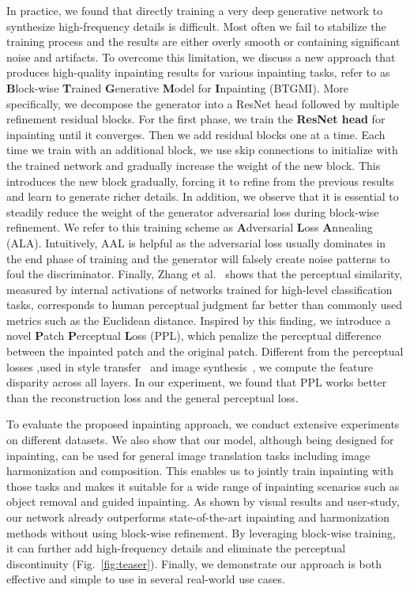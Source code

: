 In practice, we found that directly training a very deep generative network to synthesize high-frequency details is difficult. Most often we fail to stabilize the training process and the results are either overly smooth or containing significant noise and artifacts. To overcome this limitation, we discuss a new approach that produces high-quality inpainting results for various inpainting tasks, refer to as \textbf{B}lock-wise \textbf{T}rained \textbf{G}enerative \textbf{M}odel for \textbf{I}npainting (BTGMI). More specifically, we decompose the generator into a ResNet head followed by multiple refinement residual blocks. For the first phase, we train the \textbf{ResNet head} for inpainting until it converges. Then we add residual blocks one at a time. Each time we train with an additional block, we use skip connections to initialize with the trained network and gradually increase the weight of the new block. This introduces the new block gradually, forcing it to refine from the previous results and learn to generate richer details. In addition, we observe that it is essential to steadily reduce the weight of the generator adversarial loss during block-wise refinement. We refer to this training scheme as \textbf{A}dversarial \textbf{L}oss \textbf{A}nnealing (ALA).  Intuitively, AAL is helpful as the adversarial loss usually dominates in the end phase of training and the generator will falsely create noise patterns to foul the discriminator. Finally, Zhang et al.~\cite{zhang2018unreasonable} shows that the perceptual similarity, measured by internal activations of networks trained for high-level classification tasks, corresponds to human perceptual judgment far better than commonly used metrics such as the Euclidean distance. Inspired by this finding, we introduce a novel \textbf{P}atch \textbf{P}erceptual \textbf{L}oss (PPL), which penalize the perceptual difference between the inpainted patch and the original patch. Different from the perceptual losses ,used in style transfer~\cite{johnson2016perceptual,gatys2016image} and image synthesis~\cite{dosovitskiy2016generating,chen2017photographic}, we compute the feature disparity across all layers. In our experiment, we found that PPL works better than the reconstruction loss and the general perceptual loss. 

To evaluate the proposed inpainting approach, we conduct extensive experiments on different datasets. We also show that our model, although being designed for inpainting, can be used for general image translation tasks including image harmonization and composition. This enables us to jointly train inpainting with those tasks and makes it suitable for a wide range of inpainting scenarios such as object removal and guided inpainting. As shown by visual results and user-study, our network already outperforms state-of-the-art inpainting and harmonization methods without using block-wise refinement. By leveraging block-wise training, it can further add high-frequency details and eliminate the perceptual discontinuity (Fig.~\ref{fig:teaser}). Finally, we demonstrate our approach is both effective and simple to use in several real-world use cases. 

